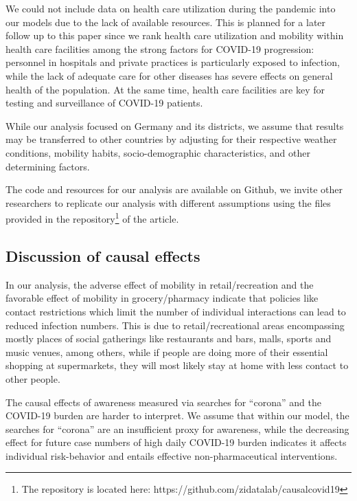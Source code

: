 \documentclass[]{elsarticle} %
\begin{document}
We could not include data on health care utilization during the pandemic
into our models due to the lack of available resources. This is planned
for a later follow up to this paper since we rank health care
utilization and mobility within health care facilities among the strong
factors for COVID-19 progression: personnel in hospitals and private
practices is particularly exposed to infection, while the lack of
adequate care for other diseases has severe effects on general health of
the population. At the same time, health care facilities are key for
testing and surveillance of COVID-19 patients.

While our analysis focused on Germany and its districts, we assume that
results may be transferred to other countries by adjusting for their
respective weather conditions, mobility habits, socio-demographic
characteristics, and other determining factors.

The code and resources for our analysis are available on Github, we
invite other researchers to replicate our analysis with different
assumptions using the files provided in the repository\footnote{The
  repository is located here: https://github.com/zidatalab/causalcovid19}
of the article.

\subsection{Discussion of causal
effects}\label{discussion-of-causal-effects}

In our analysis, the adverse effect of mobility in retail/recreation and
the favorable effect of mobility in grocery/pharmacy indicate that
policies like contact restrictions which limit the number of individual
interactions can lead to reduced infection numbers. This is due to
retail/recreational areas encompassing mostly places of social
gatherings like restaurants and bars, malls, sports and music venues,
among others, while if people are doing more of their essential shopping
at supermarkets, they will most likely stay at home with less contact to
other people.

The causal effects of awareness measured via searches for ``corona'' and
the COVID-19 burden are harder to interpret. We assume that within our
model, the searches for ``corona'' are an insufficient proxy for
awareness, while the decreasing effect for future case numbers of high
daily COVID-19 burden indicates it affects individual risk-behavior and
entails effective non-pharmaceutical interventions.
\end{document}
